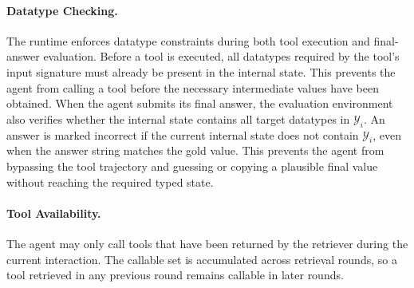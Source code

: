\documentclass{llmxive}
\begin{document}
\paragraph{Datatype Checking.}
The runtime enforces datatype constraints during both tool execution and final-answer evaluation. 
Before a tool is executed, all datatypes required by the tool's input signature must already be present in the internal state. 
This prevents the agent from calling a tool before the necessary intermediate values have been obtained. 
When the agent submits its final answer, the evaluation environment also verifies whether the internal state contains all target datatypes in $\mathcal{Y}_i$.
An answer is marked incorrect if the current internal state does not contain $\mathcal{Y}_i$, even when the answer string matches the gold value.
This prevents the agent from bypassing the tool trajectory and guessing or copying a plausible final value without reaching the required typed state.

\paragraph{Tool Availability.}
The agent may only call tools that have been returned by the retriever during the current interaction. 
The callable set is accumulated across retrieval rounds, so a tool retrieved in any previous round remains callable in later rounds. 

\end{document}
